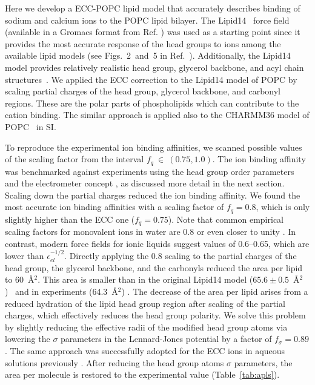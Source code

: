 \documentclass[journal=jpcbfk,manuscript=article]{achemso}
\begin{document}
Here we develop a ECC-POPC lipid model that accurately describes binding 
of sodium and calcium ions to the POPC  lipid bilayer. 
The Lipid14~\cite{dickson14} force field 
(available in a Gromacs format from Ref. ) was used as a starting 
point since 
it provides the most accurate response of the head groups to ions among the available 
lipid models (see Figs.~2~and~5 in Ref.~). Additionally, the Lipid14 model 
provides relatively realistic head group, glycerol backbone, and acyl chain structures~\cite{dickson14,botan15}.
We applied the ECC correction 
to the Lipid14 model of POPC by scaling 
partial charges of the head group, glycerol 
backbone, and carbonyl regions. 
These are the polar parts of phospholipids which can 
contribute to the cation binding.
The similar approach is applied  also to the CHARMM36 model of POPC~\cite{klauda10} in SI.

To reproduce the experimental ion binding affinities,
we scanned possible values of the scaling factor from the interval $f_q~\in~(0.75, 1.0)$.
The ion binding affinity was benchmarked against experiments
using the head group order parameters and the electrometer concept \cite{seelig87,catte16},
as discussed more detail in the next section.
Scaling down the partial charges reduced the ion binding affinity.
We found the most accurate ion binding affinities with a scaling factor of $f_q = 0.8$,
which is only slightly higher than the ECC one ($f_q=0.75$).
Note that common empirical scaling factors for monovalent ions in water are 0.8 or
even closer to unity \cite{benavides17,skinner14,nacleps}.  In contrast, modern force fields
for ionic liquids suggest values of 0.6--0.65, which are lower than $\epsilon^{-1/2}_{el}$\cite{holm14}.
Directly applying
the 0.8 scaling to the partial charges of the head group, the glycerol backbone, and
the carbonyls reduced the area per lipid to 60~\AA$^2$. This area is smaller than in the
original Lipid14 model ($65.6 \pm 0.5$~\AA$^2$)~\cite{dickson14} and in experiments
(64.3~\AA$^2$) \cite{kucerka11}. The decrease of the area per lipid arises from a
reduced hydration of the lipid head group region after scaling of the partial charges, which effectively
reduces the head group polarity. We solve this problem by slightly reducing the effective radii of
the modified head group atoms via lowering the $\sigma$ parameters in the Lennard-Jones potential by a
factor of $f_\sigma = 0.89$. The same approach was successfully adopted for the ECC ions in aqueous
solutions previously \cite{kohagen14, kohagen16, Pluharova2014, martinek17}. After reducing the head group atoms $\sigma$ parameters, the area per molecule is restored to the experimental value (Table~\ref{tab:apls}). 
\end{document}
